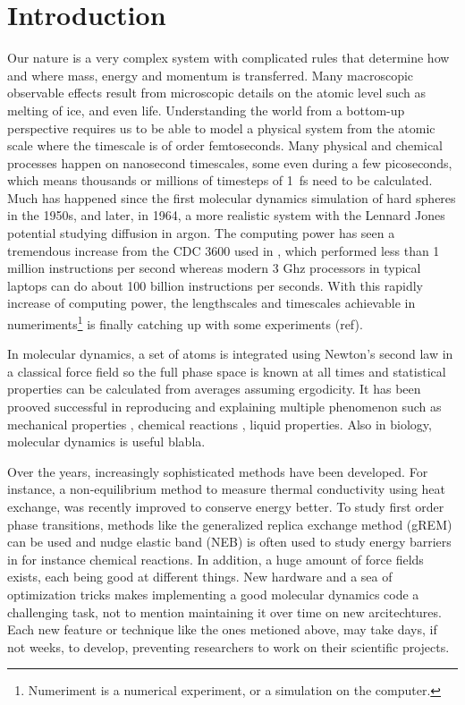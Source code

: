 \documentclass[aps,pre,twocolumn,letterpaper,floatfix,nofootinbib]{revtex4}
\begin{document}
\section{Introduction}
Our nature is a very complex system with complicated rules that determine how and where mass, energy and momentum is transferred.
Many macroscopic observable effects result from microscopic details on the atomic level such as melting of ice, and even life.
Understanding the world from a bottom-up perspective requires us to be able to model a physical system from the atomic scale where the timescale is of order femtoseconds.
Many physical and chemical processes happen on nanosecond timescales, some even during a few picoseconds, which means thousands or millions of timesteps of \SI{1}{\femto\second} need to be calculated.
Much has happened since the first molecular dynamics simulation of hard spheres in the 1950s\citep{alder1957phase,alder1959studies}, and later, in 1964, a more realistic system with the Lennard Jones potential studying diffusion in argon\citep{rahman1964correlations}.
The computing power has seen a tremendous increase from the CDC 3600 used in \citep{rahman1964correlations}, which performed less than 1 million instructions per second whereas modern 3 Ghz processors in typical laptops can do about 100 billion instructions per seconds.
With this rapidly increase of computing power, the lengthscales and timescales achievable in numeriments\footnote{Numeriment is a numerical experiment, or a simulation on the computer.} is finally catching up with some experiments (ref).

In molecular dynamics, a set of atoms is integrated using Newton's second law in a classical force field so the full phase space is known at all times and statistical properties can be calculated from averages assuming ergodicity.
It has been prooved successful in reproducing and explaining multiple phenomenon such as mechanical properties \citep{jiang2009young, campbell1999structural, ning2012mechanical}, chemical reactions \citep{van2001reaxff, brenner2002second}, liquid properties\citep{allen2017computer}.
Also in biology, molecular dynamics is useful blabla.

Over the years, increasingly sophisticated methods have been developed.
For instance, a non-equilibrium method to measure thermal conductivity using heat exchange, was recently improved\citep{wirnsberger2015enhanced} to conserve energy better.
To study first order phase transitions, methods like the generalized replica exchange method (gREM)\citep{kim2010generalized} can be used and nudge elastic band (NEB)\citep{henkelman2000climbing, henkelman2000improved} is often used to study energy barriers in for instance chemical reactions.
In addition, a huge amount of force fields exists, each being good at different things.
New hardware and a sea of optimization tricks makes implementing a good molecular dynamics code a challenging task, not to mention maintaining it over time on new arcitechtures.
Each new feature or technique like the ones metioned above, may take days, if not weeks, to develop, preventing researchers to work on their scientific projects.
\end{document}
